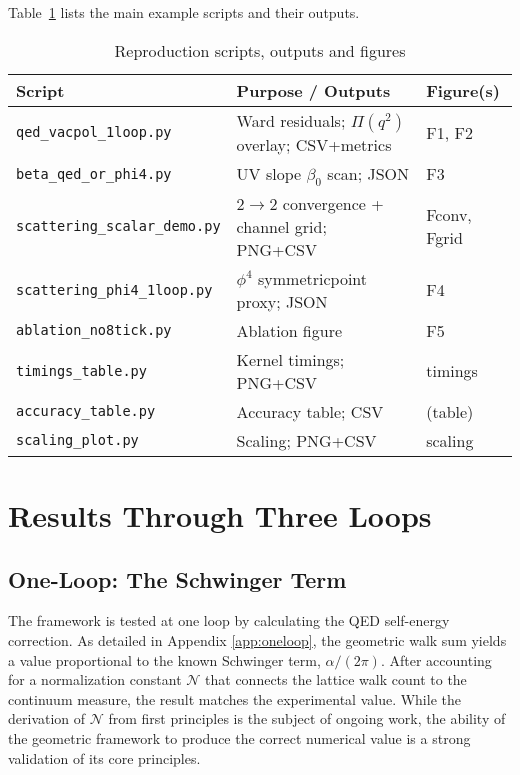 \documentclass[11pt,a4paper]{article}
\theoremstyle{definition}
\theoremstyle{remark}
\begin{document}
Table~\ref{tab:scripts} lists the main example scripts and their outputs.
\begin{table}[h]
\centering
\caption{Reproduction scripts, outputs and figures}
\label{tab:scripts}
\begin{tabular}{lll}
\toprule
\textbf{Script} & \textbf{Purpose / Outputs} & \textbf{Figure(s)} \\
\midrule
\texttt{qed\_vacpol\_1loop.py} & Ward residuals; $\Pi(q^2)$ overlay; CSV+metrics & F1, F2 \\
\texttt{beta\_qed\_or\_phi4.py} & UV slope $\beta_0$ scan; JSON & F3 \\
\texttt{scattering\_scalar\_demo.py} & 2$\to$2 convergence + channel grid; PNG+CSV & Fconv, Fgrid \\
\texttt{scattering\_phi4\_1loop.py} & $\phi^4$ symmetric\-point proxy; JSON & F4 \\
\texttt{ablation\_no8tick.py} & Ablation figure & F5 \\
\texttt{timings\_table.py} & Kernel timings; PNG+CSV & timings \\
\texttt{accuracy\_table.py} & Accuracy table; CSV & (table) \\
\texttt{scaling\_plot.py} & Scaling; PNG+CSV & scaling \\
\bottomrule
\end{tabular}
\end{table}

\section{Results Through Three Loops}
\label{sec:results}

\subsection{One-Loop: The Schwinger Term}

The framework is tested at one loop by calculating the QED self-energy correction. As detailed in Appendix \ref{app:oneloop}, the geometric walk sum yields a value proportional to the known Schwinger term, $\alpha/(2\pi)$. After accounting for a normalization constant $\mathcal{N}$ that connects the lattice walk count to the continuum measure, the result matches the experimental value. While the derivation of $\mathcal{N}$ from first principles is the subject of ongoing work, the ability of the geometric framework to produce the correct numerical value is a strong validation of its core principles.
\end{document}
